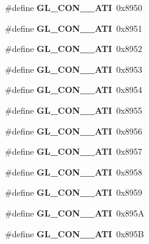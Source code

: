 \begin{DoxyCompactItemize}
\item 
\#define {\bfseries G\+L\+\_\+\+C\+O\+N\+\_\+\_\+\+A\+T\+I}~0x8950\label{_s_d_l__opengl_8h_a7a6a21b915466182ac78f92e5fa2f959}

\item 
\#define {\bfseries G\+L\+\_\+\+C\+O\+N\+\_\+\_\+\+A\+T\+I}~0x8951\label{_s_d_l__opengl_8h_a3a6308817288289faa49fd1947a3ba2c}

\item 
\#define {\bfseries G\+L\+\_\+\+C\+O\+N\+\_\+\_\+\+A\+T\+I}~0x8952\label{_s_d_l__opengl_8h_ac2e961ee4aefba133e423435e03f6f30}

\item 
\#define {\bfseries G\+L\+\_\+\+C\+O\+N\+\_\+\_\+\+A\+T\+I}~0x8953\label{_s_d_l__opengl_8h_a939d82c90eee89f7e09621ee917002f8}

\item 
\#define {\bfseries G\+L\+\_\+\+C\+O\+N\+\_\+\_\+\+A\+T\+I}~0x8954\label{_s_d_l__opengl_8h_a6e47403a44ea898923b08c3abecd28a4}

\item 
\#define {\bfseries G\+L\+\_\+\+C\+O\+N\+\_\+\_\+\+A\+T\+I}~0x8955\label{_s_d_l__opengl_8h_aaa2cb2a99b3513174450dab5bb530cc1}

\item 
\#define {\bfseries G\+L\+\_\+\+C\+O\+N\+\_\+\_\+\+A\+T\+I}~0x8956\label{_s_d_l__opengl_8h_a2fcc0158e7cf782d2dcaab88069a3e44}

\item 
\#define {\bfseries G\+L\+\_\+\+C\+O\+N\+\_\+\_\+\+A\+T\+I}~0x8957\label{_s_d_l__opengl_8h_a8c8408934da9d0cbdb36fde3fae846c5}

\item 
\#define {\bfseries G\+L\+\_\+\+C\+O\+N\+\_\+\_\+\+A\+T\+I}~0x8958\label{_s_d_l__opengl_8h_a1ac54999d967c2500a7689db9b44e85f}

\item 
\#define {\bfseries G\+L\+\_\+\+C\+O\+N\+\_\+\_\+\+A\+T\+I}~0x8959\label{_s_d_l__opengl_8h_a3a9f5ff32cf9b3e5fdfc9450735b7500}

\item 
\#define {\bfseries G\+L\+\_\+\+C\+O\+N\+\_\+\_\+\+A\+T\+I}~0x895\+A\label{_s_d_l__opengl_8h_ad5755703bfe6913ffbeea9b30fd3430d}

\item 
\#define {\bfseries G\+L\+\_\+\+C\+O\+N\+\_\+\_\+\+A\+T\+I}~0x895\+B\label{_s_d_l__opengl_8h_a7a8a47c80fe06f9a346b19d693ae89b0}


\end{DoxyCompactItemize}
